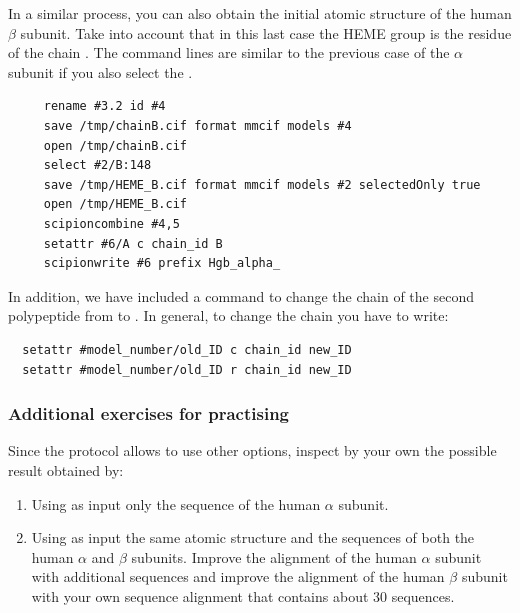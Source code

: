 In a similar process, you can also obtain the initial atomic structure of the human  $\beta$ subunit. Take into account that in this last case the HEME group is the residue  of the chain . The command lines are similar to the previous case of the  $\alpha$ subunit if you also select the  . 
\begin{verbatim}
     rename #3.2 id #4
     save /tmp/chainB.cif format mmcif models #4
     open /tmp/chainB.cif
     select #2/B:148
     save /tmp/HEME_B.cif format mmcif models #2 selectedOnly true 
     open /tmp/HEME_B.cif
     scipioncombine #4,5
     setattr #6/A c chain_id B
     scipionwrite #6 prefix Hgb_alpha_
 \end{verbatim}
 
 In addition, we have included a command to change the chain  of the second polypeptide from  to . In general, to change the chain  you have to write:
 \begin{verbatim}
  setattr #model_number/old_ID c chain_id new_ID
  setattr #model_number/old_ID r chain_id new_ID
 \end{verbatim}


\subsubsection*{Additional exercises for practising}
Since the protocol  allows to use other options, inspect by your own the possible result obtained by:\\
\begin{enumerate}
 \item Using as input only the  sequence of the human  $\alpha$ subunit.
 \item Using as input the same atomic structure  and the  sequences of both the human  $\alpha$ and $\beta$ subunits. Improve the alignment of the human  $\alpha$ subunit with additional sequences and improve the alignment of the human  $\beta$ subunit with your own sequence alignment that contains about 30 sequences.
\end{enumerate}


